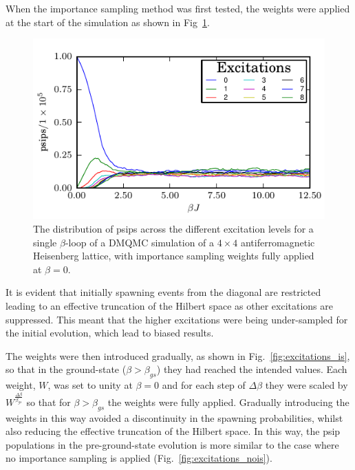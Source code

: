 When the importance sampling method was first tested, the weights were applied at the start of the simulation as shown in Fig~\ref{fig:excitations_is_instant}. 
\begin{figure}[H]
\begin{center}
\includegraphics[width =1\textwidth]{excitations_is_instant.pdf}
\caption[The distribution of psips across the different excitation levels for a single $\beta$-loop of a DMQMC simulation of a $4\times4$ antiferromagnetic Heisenberg lattice, with importance sampling weights fully applied at $\beta = 0$.]{The distribution of psips across the different excitation levels for a single $\beta$-loop of a DMQMC simulation of a $4\times4$ antiferromagnetic Heisenberg lattice, with importance sampling weights fully applied at $\beta = 0$.}
\label{fig:excitations_is_instant}
\end{center}
\end{figure} It is evident that initially spawning events from the diagonal are restricted leading to an effective truncation of the Hilbert space as other excitations are suppressed. This meant that the higher excitations were being under-sampled for the initial evolution, which lead to biased results.

The weights were then introduced gradually, as shown in Fig.~\ref{fig:excitations_is}, so that in the ground-state ($\beta > \beta_{gs}$) they had reached the intended values. Each weight, $W$, was set to unity at $\beta = 0$ and for each step of $\Delta \beta$ they were scaled by $W^{\frac{\Delta\beta}{\beta_{gs}}}$ so that for $\beta > \beta_{gs}$ the weights were fully applied. Gradually introducing the weights in this way avoided a discontinuity in the spawning probabilities, whilst also reducing the effective truncation of the Hilbert space.  In this way, the psip populations in the pre-ground-state evolution is more similar to the case where no importance sampling is applied (Fig.~\ref{fig:excitations_nois}).

